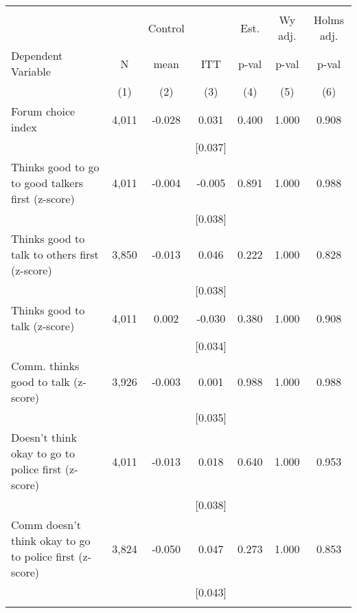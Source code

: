 \begin{tabular}{lcccccc}
\hline \noalign{\smallskip} &  &  &  &  &  & \\
 &  & Control &  & Est. & Wy adj. & Holms adj.\\
Dependent Variable & N & mean & ITT & p-val & p-val & p-val\\
 & (1) & (2) & (3) & (4) & (5) & (6)\\
\noalign{\smallskip}\hline \noalign{\smallskip}\quad Forum choice index & 4,011 & -0.028 & 0.031 & 0.400 & 1.000 & 0.908\\
 &  &  & [0.037] &  &  & \\
\quad Thinks good to go to good talkers first (z-score) & 4,011 & -0.004 & -0.005 & 0.891 & 1.000 & 0.988\\
 &  &  & [0.038] &  &  & \\
\quad Thinks good to talk to others first (z-score) & 3,850 & -0.013 & 0.046 & 0.222 & 1.000 & 0.828\\
 &  &  & [0.038] &  &  & \\
\quad Thinks good to talk (z-score) & 4,011 & 0.002 & -0.030 & 0.380 & 1.000 & 0.908\\
 &  &  & [0.034] &  &  & \\
\quad Comm. thinks good to talk (z-score) & 3,926 & -0.003 & 0.001 & 0.988 & 1.000 & 0.988\\
 &  &  & [0.035] &  &  & \\
\quad Doesn't think okay to go to police first (z-score) & 4,011 & -0.013 & 0.018 & 0.640 & 1.000 & 0.953\\
 &  &  & [0.038] &  &  & \\
\quad Comm doesn't think okay to go to police first (z-score) & 3,824 & -0.050 & 0.047 & 0.273 & 1.000 & 0.853\\
 &  &  & [0.043] &  &  & \\
\noalign{\smallskip}\hline\end{tabular}
